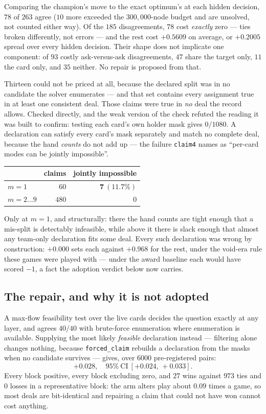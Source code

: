 \documentclass[11pt,a4paper]{article}
\begin{document}
Comparing the champion's move to the exact optimum's at each hidden decision,
$78$ of $263$ agree ($10$ more exceeded the $300{,}000$-node budget and are
unsolved, not counted either way). Of the $185$ disagreements, $78$ cost
\emph{exactly} zero --- ties broken differently, not errors --- and the rest cost
$+0.5609$ on average, or $+0.2005$ spread over every hidden decision. Their shape does not implicate one component: of $93$ costly
ask-versus-ask disagreements, $47$ share the target only, $11$ the card only,
and $35$ neither. No repair is proposed from that.

Thirteen could not be priced at all, because the declared split was in no
candidate the solver enumerates --- and that set contains every assignment true
in at least one consistent deal. Those claims were true in \emph{no} deal the
record allows. Checked directly, and the weak version of the check refuted the
reading it was built to confirm: testing each card's own holder mask gives
$0/1080$. A declaration can satisfy every card's mask separately and match no
complete deal, because the hand \emph{counts} do not add up --- the failure
\texttt{claim4} names as ``per-card modes can be jointly impossible''.

\begin{center}
\begin{tabular}{lrr}
\toprule
& claims & jointly impossible \\
\midrule
$m = 1$ & $60$ & $\mathbf{7\ (11.7\%)}$ \\
$m = 2 \dots 9$ & $480$ & $0$ \\
\bottomrule
\end{tabular}
\end{center}

Only at $m = 1$, and structurally: there the hand counts are tight enough that
a mis-split is detectably infeasible, while above it there is slack enough that
almost any team-only declaration fits some deal. Every such declaration was
wrong by construction: $+0.000$ sets each against $+0.968$ for the rest,
under the void-era rule these games were played with --- under the award
baseline each would have scored $-1$, a fact the adoption verdict below now
carries.

\subsection{The repair, and why it is not adopted}

A max-flow feasibility test over the live cards decides the question exactly at
any layer, and agrees $40/40$ with brute-force enumeration where enumeration is
available. Supplying the most likely \emph{feasible} declaration instead ---
filtering alone changes nothing, because \texttt{forced\_claim} rebuilds a
declaration from the masks when no candidate survives --- gives, over $6000$
pre-registered pairs:
\[
+0.028,\quad 95\%\ \text{CI}\ [+0.024,\, +0.033].
\]
Every block positive, every block excluding zero, and $27$ wins against $973$
ties and $0$ losses in a representative block: the arm alters play about $0.09$
times a game, so most deals are bit-identical and repairing a claim that could
not have won cannot cost anything.
\end{document}
